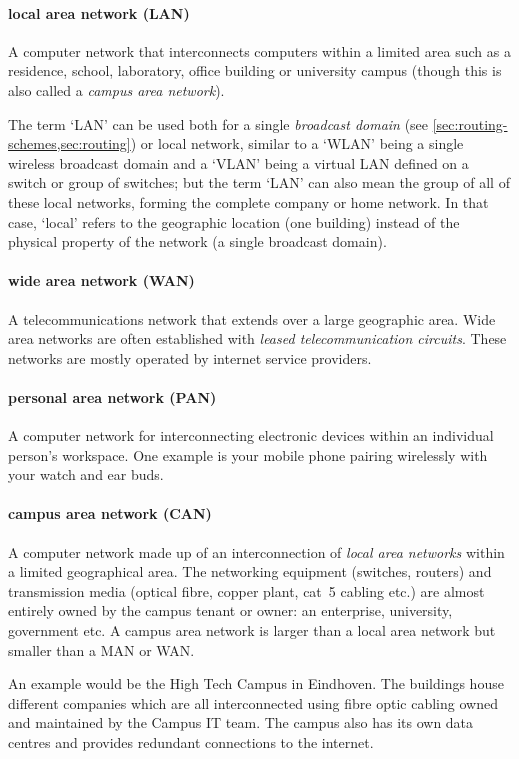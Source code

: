 {\paragraph{local area network (LAN)}
A computer network that interconnects computers within a limited area such as a residence, school, laboratory, office building or university campus (though this is also called a \emph{campus area network}).

The term `LAN' can be used both for a single \emph{broadcast domain} (see \vref{sec:routing-schemes,sec:routing}) or local network, similar to a `WLAN' being a single wireless broadcast domain and a `VLAN' being a virtual LAN defined on a switch or group of switches; but the term `LAN' can also mean the group of all of these local networks, forming the complete company or home network.
In that case, `local' refers to the geographic location (one building) instead of the physical property of the network (a single broadcast domain).

\paragraph{wide area network (WAN)}
A telecommunications network that extends over a large geographic area.
Wide area networks are often established with \emph{leased telecommunication circuits}.
These networks are mostly operated by internet service providers.

\paragraph{personal area network (PAN)}
A computer network for interconnecting electronic devices within an individual person's workspace.
One example is your mobile phone pairing wirelessly with your watch and ear buds.

\paragraph{campus area network (CAN)}
A computer network made up of an interconnection of \emph{local area networks} within a limited geographical area.
The networking equipment (switches, routers) and transmission media (optical fibre, copper plant, cat~5 cabling etc.) are almost entirely owned by the campus tenant or owner: an enterprise, university, government etc.
A campus area network is larger than a local area network but smaller than a MAN or WAN.

An example would be the High Tech Campus in Eindhoven.
The buildings house different companies which are all interconnected using fibre optic cabling owned and maintained by the Campus IT team.
The campus also has its own data centres and provides redundant connections to the internet.

}

